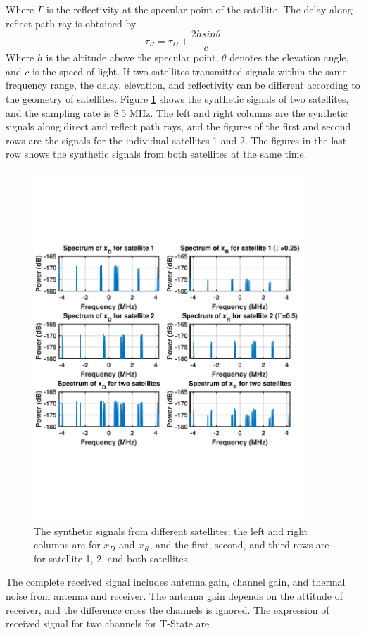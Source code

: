 Where $\Gamma$ is the reflectivity at the specular point of the satellite. The delay along reflect path ray is obtained by
\begin{equation}
\tau_{R} = \tau_{D} +  \frac{2 h sin \theta}{c}
\end{equation}
Where $h$ is the altitude above the specular point, $\theta$ denotes the elevation angle, and $c$ is the speed of light. If two satellites transmitted signals within the same frequency range, the delay, elevation, and reflectivity can be different according to the geometry of satellites. Figure \ref{fig:simu_xDxR} shows the synthetic signals of two satellites, and the sampling rate is 8.5 MHz. The left and right columns are the synthetic signals along direct and reflect path rays, and the figures of the first and second rows  are the signals for the individual satellites 1 and 2. The figures in the last row shows the synthetic signals from both satellites at the same time.
\begin{figure}[t!]
	\centering
	\includegraphics[width=4in]{pdf/Simulator_xDxR.pdf}
	\caption{The synthetic signals from different satellites; the left and right columns are for $x_D$ and $x_R$, and the first, second, and third rows are for satellite 1, 2, and both satellites. }
	\centering
	\label{fig:simu_xDxR}
\end{figure}
The complete received signal includes antenna gain, channel gain, and thermal noise from antenna and receiver. The antenna gain depends on the attitude of receiver, and the difference cross the channels is ignored. The expression of received signal for two channels for T-State are
